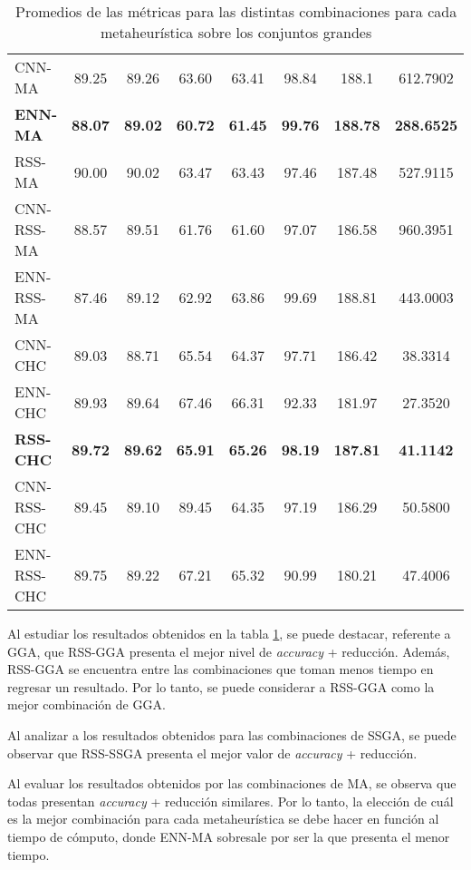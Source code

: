 \begin{table}[h!]
\begin{adjustbox}{max width =\textwidth}
\begin{tabular}{l c c c c c c c}
\hline

CNN-MA & 89.25 & 89.26 & 63.60 & 63.41 & 98.84 & 188.1 & 612.7902 \\
\textbf{ENN-MA} & \textbf{88.07} & \textbf{89.02} & \textbf{60.72} & \textbf{61.45} & \textbf{99.76} & \textbf{188.78} & \textbf{288.6525} \\
RSS-MA & 90.00 & 90.02 & 63.47 & 63.43 & 97.46 & 187.48 & 527.9115 \\
CNN-RSS-MA & 88.57 & 89.51 & 61.76 & 61.60 & 97.07 & 186.58 & 960.3951 \\
ENN-RSS-MA & 87.46 & 89.12 & 62.92 & 63.86 & 99.69 & 188.81 & 443.0003 \\

\hline

CNN-CHC & 89.03 & 88.71 & 65.54 & 64.37 & 97.71 & 186.42 & 38.3314 \\
ENN-CHC & 89.93 & 89.64 & 67.46 & 66.31 & 92.33 & 181.97 & 27.3520 \\
\textbf{RSS-CHC} & \textbf{89.72} & \textbf{89.62} & \textbf{65.91} & \textbf{65.26} & \textbf{98.19} & \textbf{187.81} & \textbf{41.1142} \\
CNN-RSS-CHC & 89.45 & 89.10 & 89.45 & 64.35 & 97.19 & 186.29 & 50.5800 \\
ENN-RSS-CHC & 89.75 & 89.22 & 67.21 & 65.32 & 90.99 & 180.21 & 47.4006 \\

\hline
\end{tabular}
\end{adjustbox}
\caption{Promedios de las métricas para las distintas combinaciones para cada metaheurística sobre los conjuntos grandes}
\label{grande-all}

\end{table}

Al estudiar los resultados obtenidos en la tabla \ref{grande-all}, se puede destacar, referente a GGA, que RSS-GGA presenta el mejor nivel de \emph{accuracy} + reducción. Además, RSS-GGA se encuentra entre las combinaciones que toman menos tiempo en regresar un resultado. Por lo tanto, se puede considerar a RSS-GGA como la mejor combinación de GGA.

Al analizar a los resultados obtenidos para las combinaciones de SSGA, se puede observar que RSS-SSGA presenta el mejor valor de \emph{accuracy} + reducción. 

Al evaluar los resultados obtenidos por las combinaciones de MA, se observa que todas presentan \emph{accuracy} + reducción similares. Por lo tanto, la elección de cuál es la mejor combinación para cada metaheurística se debe hacer en función al tiempo de cómputo, donde ENN-MA sobresale por ser la que presenta el menor tiempo.

